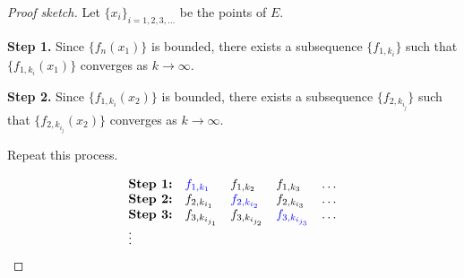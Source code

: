\documentclass[letterpaper, reqno,11pt]{article}
\begin{document}
\begin{proof}[Proof sketch]
  \renewcommand{\qedsymbol}{}
  Let $\{ x_i \}_{i = 1, 2, 3, \ldots}$ be the points of $E$.

  {\bf Step 1.} Since $\{ f_n(x_1) \}$ is bounded, there exists a subsequence $\{ f_{1, k_i} \}$ such that $\{ f_{1, k_i}(x_1) \}$ converges as $k \to \infty$.

  {\bf Step 2.} Since $\{ f_{1, k_i}(x_2) \}$ is bounded, there exists a subsequence $\{ f_{2, k_{i_j}} \}$ such that $\{ f_{2, k_{i_j}}(x_2) \}$ converges as $k \to \infty$.

  Repeat this process.

  $$
  \begin{array}{lllll}
    \textbf{Step 1:} & \text{\color{blue} $f_{1, k_1}$} & f_{1, k_2} & f_{1, k_3} & \ldots \\
    \textbf{Step 2:} & f_{2, k_{i_1}} & \text{\color{blue} $f_{2, k_{i_2}}$} & f_{2, k_{i_3}} & \ldots \\
    \textbf{Step 3:} & f_{3, k_{i_{j_1}}} & f_{3, k_{i_{j_2}}} & \text{\color{blue} $f_{3, k_{i_{j_3}}}$} & \ldots \\
    \vdots & & & &
  \end{array}
  $$
\end{proof}
\end{document}
